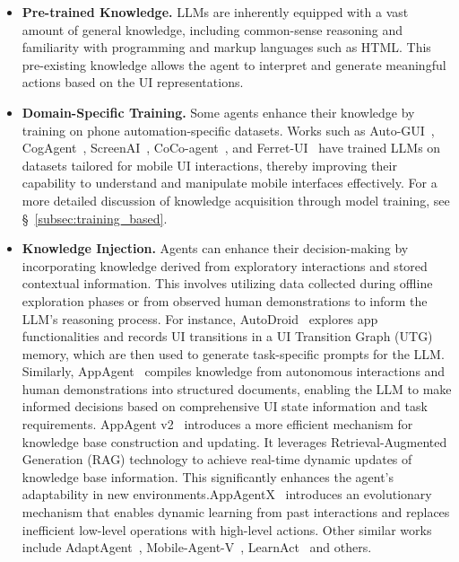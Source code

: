 \begin{itemize}
    \item \textbf{Pre-trained Knowledge.} LLMs are inherently equipped with a vast amount of general knowledge, including common-sense reasoning and familiarity with programming and markup languages such as HTML. This pre-existing knowledge allows the agent to interpret and generate meaningful actions based on the UI representations.
    
    \item \textbf{Domain-Specific Training.} Some agents enhance their knowledge by training on phone automation-specific datasets. Works such as Auto-GUI~\cite{zhang2023youautoui}, CogAgent~\cite{hong2024cogagent}, ScreenAI~\cite{baechler2024screenai}, CoCo-agent~\cite{ma2024coco}, and Ferret-UI~\cite{you2024ferret} have trained LLMs on datasets tailored for mobile UI interactions, thereby improving their capability to understand and manipulate mobile interfaces effectively. For a more detailed discussion of knowledge acquisition through model training, see \S\ \ref{subsec:training_based}.

    
    \item \textbf{Knowledge Injection.} Agents can enhance their decision-making by incorporating knowledge derived from exploratory interactions and stored contextual information. This involves utilizing data collected during offline exploration phases or from observed human demonstrations to inform the LLM's reasoning process. For instance, AutoDroid~\cite{wen2024autodroid} explores app functionalities and records UI transitions in a UI Transition Graph (UTG) memory, which are then used to generate task-specific prompts for the LLM. Similarly, AppAgent~\cite{zhang2023appagent} compiles knowledge from autonomous interactions and human demonstrations into structured documents, enabling the LLM to make informed decisions based on comprehensive UI state information and task requirements.
    AppAgent v2~\cite{li2024appagentv2} introduces a more efficient mechanism for knowledge base construction and updating. It leverages Retrieval-Augmented Generation (RAG) technology to achieve real-time dynamic updates of knowledge base information. This significantly enhances the agent's adaptability in new environments.AppAgentX~\cite{jiang2025appagentx} introduces an evolutionary mechanism that enables dynamic learning from past interactions and replaces inefficient low-level operations with high-level actions. Other similar works include AdaptAgent~\cite{verma2024adaptagent}, Mobile-Agent-V~\cite{wang2025mobileagentv}, LearnAct~\cite{liu2025learnact} and others.
\end{itemize}

